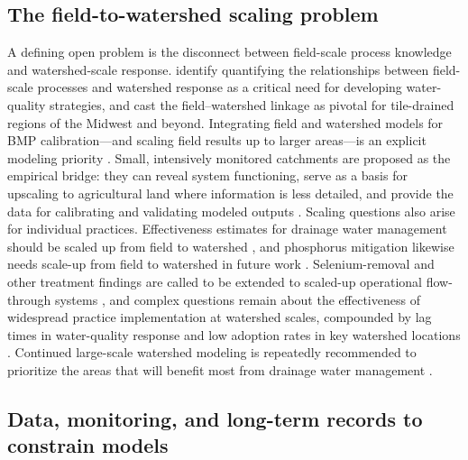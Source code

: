 \subsection{The field-to-watershed scaling problem}

A defining open problem is the disconnect between field-scale process knowledge and watershed-scale response. \textcite{Williams2015} identify quantifying the relationships between field-scale processes and watershed response as a critical need for developing water-quality strategies, and cast the field--watershed linkage as pivotal for tile-drained regions of the Midwest and beyond. Integrating field and watershed models for BMP calibration---and scaling field results up to larger areas---is an explicit modeling priority \parencite{Wang2020b}. Small, intensively monitored catchments are proposed as the empirical bridge: they can reveal system functioning, serve as a basis for upscaling to agricultural land where information is less detailed, and provide the data for calibrating and validating modeled outputs \parencite{Kyllmar2023}. Scaling questions also arise for individual practices. Effectiveness estimates for drainage water management should be scaled up from field to watershed \parencite{Wang2021}, and phosphorus mitigation likewise needs scale-up from field to watershed in future work \parencite{Wang2021}. Selenium-removal and other treatment findings are called to be extended to scaled-up operational flow-through systems \parencite{Gao2003}, and complex questions remain about the effectiveness of widespread practice implementation at watershed scales, compounded by lag times in water-quality response and low adoption rates in key watershed locations \parencite{Roley2016}. Continued large-scale watershed modeling is repeatedly recommended to prioritize the areas that will benefit most from drainage water management \parencite{Ross2016}.

\subsection{Data, monitoring, and long-term records to constrain models}

